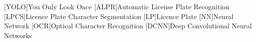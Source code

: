 [YOLO]{You Only Look Once}
[ALPR]{Automatic License Plate Recognition}
[LPCS]{Licence Plate Character Segmentation}
[LP]{Licence Plate}
[NN]{Neural Network}
[OCR]{Optical Character Recognition}
[DCNN]{Deep Convolutional Neural Networks}


